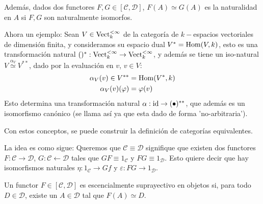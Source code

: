 Además, dados dos functores $F,G\in[\mathcal{C,D}]$, $F(A)\simeq G(A)$ es la naturalidad en $A$ si $F,G$ son naturalmente isomorfos.

Ahora un ejemplo:
Sean $V\in\mathrm{Vect}_k^{<\infty}$ de la categoría de $k-$espacios vectoriales de dimensión finita, y consideramos su espacio dual $V^*=\mathrm{Hom}(V,k)$, esto es una transformación natural $()^*:\mathrm{Vect}_k^{<\infty}\to\mathrm{Vect}_k^{<\infty}$, y además se tiene un iso-natural $V\overset{\alpha_V}{\simeq} V^{**}$, dado por la evaluación en $v$, $v\in V$:
    \begin{align*}
        \alpha_V(v)\in V^{**} & = \mathrm{Hom}(V^*,k) \\
        \alpha_V(v)(\varphi) & = \varphi(v)
    \end{align*}
Esto determina una transformación natural $\alpha:\mathrm{id}\to(\bullet)^{**}$, que además es un isomorfismo canónico (se llama así ya que esta dado de forma 'no-arbitraria').

Con estos conceptos, se puede construir la definición de categorías equivalentes.

La idea es como sigue: Queremos que $\mathcal{C\equiv D}$ signifique que existen dos functores $F:\mathcal{C\to D}$, $G:\mathcal{C\leftarrow D}$ tales que $GF\equiv 1_\mathcal{C}$ y $FG\equiv 1_\mathcal{D}$. Esto quiere decir que hay isomorfismos naturales $\eta:1_\mathcal{C}\to Gf$ y $\varepsilon: FG\to1_\mathcal{D}$.

\begin{defn}
    Un functor $F\in [\mathcal{C,D}]$ es escencialmente suprayectivo en objetos si, para todo $D\in\mathcal{D}$, existe un $A\in\mathcal{D}$ tal que $F(A)\simeq D$.
\end{defn}

